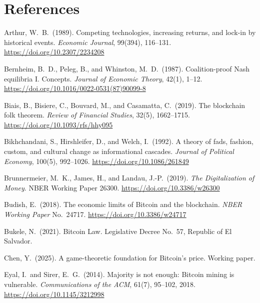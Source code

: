 \documentclass[12pt]{article}
\theoremstyle{definition}
\theoremstyle{remark}
\begin{document}
\section{References}

\begin{description}[style=nextline,leftmargin=0pt,labelsep=0pt,font=\normalfont]

\item Arthur, W.\ B.\ (1989). Competing technologies, increasing returns, and
lock-in by historical events. \emph{Economic Journal}, 99(394), 116--131.
\url{https://doi.org/10.2307/2234208}

\item Bernheim, B.\ D., Peleg, B., and Whinston, M.\ D.\ (1987). Coalition-proof
Nash equilibria I\@. Concepts. \emph{Journal of Economic Theory}, 42(1), 1--12.
\url{https://doi.org/10.1016/0022-0531(87)90099-8}

\item Biais, B., Bisiere, C., Bouvard, M., and Casamatta, C.\ (2019). The
blockchain folk theorem. \emph{Review of Financial Studies}, 32(5), 1662--1715.
\url{https://doi.org/10.1093/rfs/hhy095}

\item Bikhchandani, S., Hirshleifer, D., and Welch, I.\ (1992). A theory of
fads, fashion, custom, and cultural change as informational cascades.
\emph{Journal of Political Economy}, 100(5), 992--1026.
\url{https://doi.org/10.1086/261849}

\item Brunnermeier, M.\ K., James, H., and Landau, J.-P.\ (2019). \emph{The
Digitalization of Money}. NBER Working Paper 26300.
\url{https://doi.org/10.3386/w26300}

\item Budish, E.\ (2018). The economic limits of Bitcoin and the blockchain.
\emph{NBER Working Paper} No.\ 24717.
\url{https://doi.org/10.3386/w24717}

\item Bukele, N.\ (2021). Bitcoin Law. Legislative Decree No.\ 57,
Republic of El Salvador.

\item Chen, Y.\ (2025). A game-theoretic foundation for Bitcoin's price.
Working paper.

\item Eyal, I.\ and Sirer, E.\ G.\ (2014). Majority is not enough: Bitcoin
mining is vulnerable. \emph{Communications of the ACM}, 61(7), 95--102, 2018.
\url{https://doi.org/10.1145/3212998}


\end{description}
\end{document}

